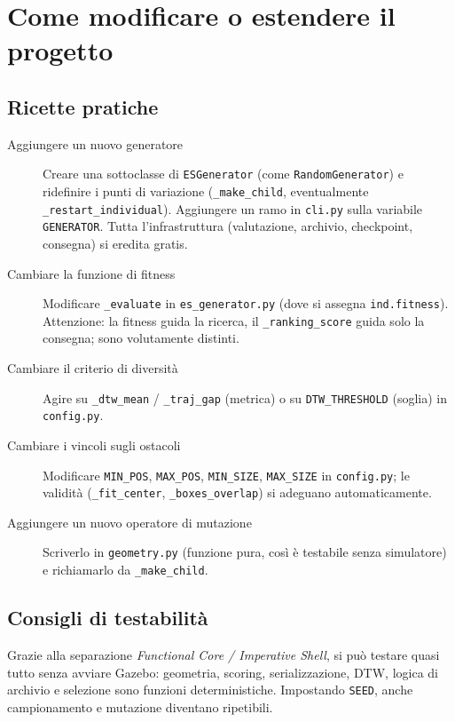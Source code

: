 \documentclass[11pt,a4paper]{report}
\newcommand{\code}[1]{\texttt{#1}}
\begin{document}
\chapter{Come modificare o estendere il progetto}

\section{Ricette pratiche}
\begin{description}
  \item[Aggiungere un nuovo generatore] Creare una sottoclasse di
    \code{ESGenerator} (come \code{RandomGenerator}) e ridefinire i punti
    di variazione (\code{\_make\_child}, eventualmente
    \code{\_restart\_individual}). Aggiungere un ramo in \code{cli.py}
    sulla variabile \code{GENERATOR}. Tutta l'infrastruttura (valutazione,
    archivio, checkpoint, consegna) si eredita gratis.
  \item[Cambiare la funzione di fitness] Modificare
    \code{\_evaluate} in \code{es\_generator.py} (dove si assegna
    \code{ind.fitness}). Attenzione: la fitness guida la ricerca, il
    \code{\_ranking\_score} guida solo la consegna; sono
    volutamente distinti.
  \item[Cambiare il criterio di diversità] Agire su \code{\_dtw\_mean} /
    \code{\_traj\_gap} (metrica) o su \code{DTW\_THRESHOLD} (soglia) in
    \code{config.py}.
  \item[Cambiare i vincoli sugli ostacoli] Modificare \code{MIN\_POS},
    \code{MAX\_POS}, \code{MIN\_SIZE}, \code{MAX\_SIZE} in
    \code{config.py}; le validità (\code{\_fit\_center},
    \code{\_boxes\_overlap}) si adeguano automaticamente.
  \item[Aggiungere un nuovo operatore di mutazione] Scriverlo in
    \code{geometry.py} (funzione pura, così è testabile senza
    simulatore) e richiamarlo da \code{\_make\_child}.
\end{description}

\section{Consigli di testabilità}
Grazie alla separazione \emph{Functional Core / Imperative Shell}, si può
testare quasi tutto senza avviare Gazebo: geometria, scoring,
serializzazione, DTW, logica di archivio e selezione sono funzioni
deterministiche. Impostando \code{SEED}, anche campionamento e mutazione
diventano ripetibili.
\end{document}
